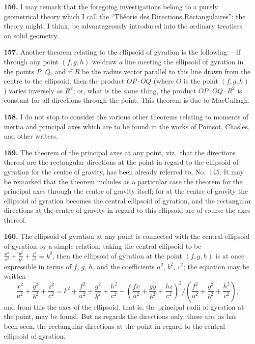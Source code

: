 \documentclass[11pt,a4paper]{article}
\theoremstyle{definition}
\begin{document}
\textbf{156.} I may remark that the foregoing investigations belong to a purely geometrical theory which I call the ``Th\'eorie des Directions Rectangulaires''; the theory might, I think, be advantageously introduced into the ordinary treatises on solid geometry.

\textbf{157.} Another theorem relating to the ellipsoid of gyration is the following:---If through any point $(f, g, h)$ we draw a line meeting the ellipsoid of gyration in the points $P$, $Q$, and if $R$ be the radius vector parallel to this line drawn from the centre to the ellipsoid, then the product $OP \cdot OQ$ (where $O$ is the point $(f, g, h)$) varies inversely as $R^2$; or, what is the same thing, the product $OP \cdot OQ \cdot R^2$ is constant for all directions through the point. This theorem is due to MacCullagh.

\textbf{158.} I do not stop to consider the various other theorems relating to moments of inertia and principal axes which are to be found in the works of Poinsot, Chasles, and other writers.

\textbf{159.} The theorem of the principal axes at any point, viz.\ that the directions thereof are the rectangular directions at the point in regard to the ellipsoid of gyration for the centre of gravity, has been already referred to, No.~145. It may be remarked that the theorem includes as a particular case the theorem for the principal axes through the centre of gravity itself; for at the centre of gravity the ellipsoid of gyration becomes the central ellipsoid of gyration, and the rectangular directions at the centre of gravity in regard to this ellipsoid are of course the axes thereof.

\textbf{160.} The ellipsoid of gyration at any point is connected with the central ellipsoid of gyration by a simple relation: taking the central ellipsoid to be $\frac{x^2}{a^2} + \frac{y^2}{b^2} + \frac{z^2}{c^2} = k^2$, then the ellipsoid of gyration at the point $(f, g, h)$ is at once expressible in terms of $f$, $g$, $h$, and the coefficients $a^2$, $b^2$, $c^2$; the equation may be written
\[
\frac{x^2}{a^2} + \frac{y^2}{b^2} + \frac{z^2}{c^2} = k^2 + \frac{f^2}{a^2} + \frac{g^2}{b^2} + \frac{h^2}{c^2} - \left(\frac{fx}{a^2} + \frac{gy}{b^2} + \frac{hz}{c^2}\right)^2 \bigg/ \left(\frac{f^2}{a^2} + \frac{g^2}{b^2} + \frac{h^2}{c^2}\right),
\]
and from this the axes of the ellipsoid, that is, the principal radii of gyration at the point, may be found. But as regards the directions only, these are, as has been seen, the rectangular directions at the point in regard to the central ellipsoid of gyration.
\end{document}
